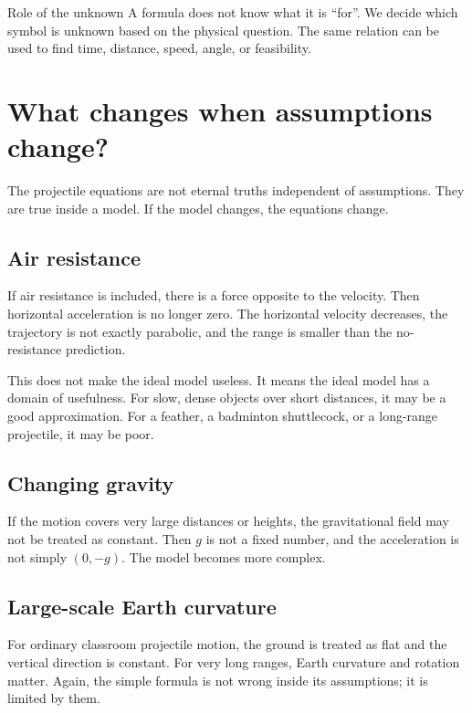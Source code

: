 \documentclass[11pt,a4paper]{article}
\begin{document}
\begin{methodbox}{Role of the unknown}
A formula does not know what it is ``for''. We decide which symbol is unknown based on the physical question. The same relation can be used to find time, distance, speed, angle, or feasibility.
\end{methodbox}

\newpage

\section{What changes when assumptions change?}

The projectile equations are not eternal truths independent of assumptions. They are true inside a model. If the model changes, the equations change.

\subsection{Air resistance}

If air resistance is included, there is a force opposite to the velocity. Then horizontal acceleration is no longer zero. The horizontal velocity decreases, the trajectory is not exactly parabolic, and the range is smaller than the no-resistance prediction.

This does not make the ideal model useless. It means the ideal model has a domain of usefulness. For slow, dense objects over short distances, it may be a good approximation. For a feather, a badminton shuttlecock, or a long-range projectile, it may be poor.

\subsection{Changing gravity}

If the motion covers very large distances or heights, the gravitational field may not be treated as constant. Then $g$ is not a fixed number, and the acceleration is not simply $(0,-g)$. The model becomes more complex.

\subsection{Large-scale Earth curvature}

For ordinary classroom projectile motion, the ground is treated as flat and the vertical direction is constant. For very long ranges, Earth curvature and rotation matter. Again, the simple formula is not wrong inside its assumptions; it is limited by them.
\end{document}
